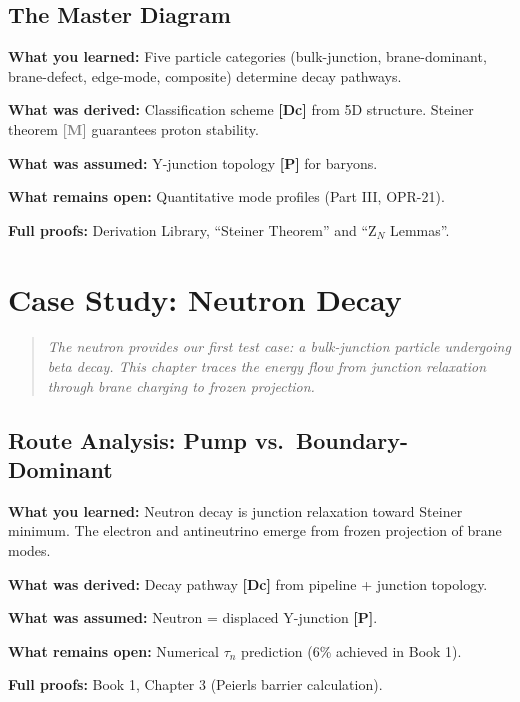 \documentclass[11pt,a4paper]{book}
\theoremstyle{definition}
\theoremstyle{remark}
\newcommand{\tagDc}{\textcolor{calibratedColor}{\textbf{[Dc]}}}
\newcommand{\tagP}{\textcolor{postulatedColor}{\textbf{[P]}}}
\newcommand{\tagM}{\textcolor{gray}{\textbf{[M]}}}
\begin{document}
\section{The Master Diagram}



\begin{chapterRecap}
\textbf{What you learned:} Five particle categories (bulk-junction, brane-dominant,
brane-defect, edge-mode, composite) determine decay pathways.

\textbf{What was derived:} Classification scheme \tagDc{} from 5D structure.
Steiner theorem \tagM{} guarantees proton stability.

\textbf{What was assumed:} Y-junction topology \tagP{} for baryons.

\textbf{What remains open:} Quantitative mode profiles (Part III, OPR-21).

\textbf{Full proofs:} Derivation Library, ``Steiner Theorem'' and ``Z$_N$ Lemmas''.
\end{chapterRecap}

\chapter{Case Study: Neutron Decay}
\label{ch:case_neutron}

\begin{quote}
\textit{The neutron provides our first test case: a bulk-junction particle
undergoing beta decay. This chapter traces the energy flow from junction
relaxation through brane charging to frozen projection.}
\end{quote}



\section{Route Analysis: Pump vs.\ Boundary-Dominant}



\begin{chapterRecap}
\textbf{What you learned:} Neutron decay is junction relaxation toward Steiner minimum.
The electron and antineutrino emerge from frozen projection of brane modes.

\textbf{What was derived:} Decay pathway \tagDc{} from pipeline + junction topology.

\textbf{What was assumed:} Neutron = displaced Y-junction \tagP{}.

\textbf{What remains open:} Numerical $\tau_n$ prediction (6\% achieved in Book 1).

\textbf{Full proofs:} Book 1, Chapter 3 (Peierls barrier calculation).
\end{chapterRecap}
\end{document}
